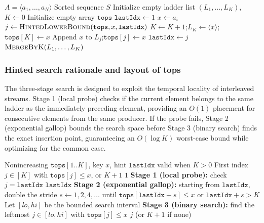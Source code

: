 \documentclass[12pt,a4paper]{article}
\theoremstyle{plain}
\theoremstyle{definition}
\newcommand{\tops}{\texttt{tops}}
\newcommand{\lastIdx}{\texttt{lastIdx}}
\begin{document}
\begin{algorithm}[H]
\caption{\textsc{LadderSort}$(A)$}
\label{alg:laddersort}
\begin{algorithmic}[1]
\Require $A = \langle a_1, \dots, a_N \rangle$
\Ensure Sorted sequence $S$
\State Initialize empty ladder list $(L_1,\dots,L_K)$, $K \gets 0$
\State Initialize empty array $\tops$
\State $\lastIdx \gets 1$
    \State $x \gets a_i$
    \State $j \gets \textsc{HintedLowerBound}(\tops, x, \lastIdx)$
        \State $K \gets K + 1$;\quad $L_K \gets \langle x \rangle$;\quad $\tops[K] \gets x$
    \Else
        \State Append $x$ to $L_j$;\quad $\tops[j] \gets x$
    \EndIf
    \State $\lastIdx \gets j$
\EndFor
\State \Return $\textsc{MergeByK}(L_1, \dots, L_K)$
\end{algorithmic}
\end{algorithm}



\subsubsection{Hinted search rationale and layout of tops}
The three-stage search is designed to exploit the temporal locality of interleaved streams. Stage 1 (local probe) checks if the current element belongs to the same ladder as the immediately preceding element, providing an $O(1)$ placement for consecutive elements from the same producer. If the probe fails, Stage 2 (exponential gallop) bounds the search space before Stage 3 (binary search) finds the exact insertion point, guaranteeing an $O(\log K)$ worst-case bound while optimizing for the common case.

\begin{algorithm}[H]
\caption{\textsc{HintedLowerBound}$(\tops[1..K], x, \lastIdx)$}
\label{alg:hinted}
\begin{algorithmic}[1]
\Require Nonincreasing $\tops[1..K]$, key $x$, hint $\lastIdx$ valid when $K>0$
\Ensure First index $j \in [K]$ with $\tops[j] \le x$, or $K+1$
    \State \Return $1$ 
\EndIf
\State \textbf{Stage 1 (local probe):} check $j = \lastIdx$
\If{$\tops[\lastIdx] \le x$}
    \State \Return $\lastIdx$ 
\EndIf
\State \textbf{Stage 2 (exponential gallop):} starting from $\lastIdx$, double
  the stride $s \gets 1, 2, 4, \dots$ until $\tops[\lastIdx + s] \le x$ or $\lastIdx + s > K$
\State Let $[\mathit{lo}, \mathit{hi}]$ be the bounded search interval
\State \textbf{Stage 3 (binary search):} find the leftmost $j \in [\mathit{lo}, \mathit{hi}]$
  with $\tops[j] \le x$
\State \Return $j$ (or $K+1$ if none)
\end{algorithmic}
\end{algorithm}
\end{document}
